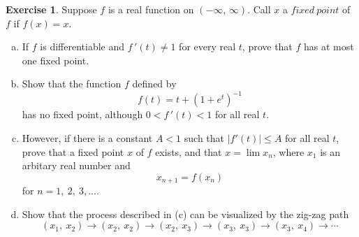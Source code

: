 \documentclass[12pt]{book}
\theoremstyle{definition}
\newtheorem{exercise}{Exercise}
\begin{document}
		\begin{exercise}
			Suppose $f$ is a real function on $(-\infty,\,\infty)$. Call $x$ a $fixed~point$ of $f$ if $f(x)=x$.
			\begin{enumerate}[(a)]
				\item If $f$ is differentiable and $f\,'(t)\neq 1 $ for every real $t$, prove that $f$ has at most one fixed point.
				\item Show that the function $f$ defined by
				\begin{equation*}
					f(t)=t+(1+e^t)^{-1}
				\end{equation*}
				has no fixed point, although $0<f\,'(t)<1$ for all real $t$.
				\item However, if there is a constant $A<1$ such that $|f'(t)|\leq A$ for all real $t$, prove that a fixed point $x$ of $f$ exists, and that $x=\lim x_n$, where $x_1$ is an arbitary real number and
				\begin{equation*}
					x_{n+1}=f(x_n)
				\end{equation*}
				for $n=1,~2,~3,...$.
				\item Show that the process described in (c) can be visualized by the zig-zag path
				\begin{equation*}
					(x_1,\ x_2)\rightarrow(x_2,\ x_2)\rightarrow(x_2,\ x_3)\rightarrow(x_3,\ x_3)\rightarrow(x_3,\ x_4)\rightarrow\cdots
				\end{equation*}
			\end{enumerate}
		\end{exercise}
\end{document}
